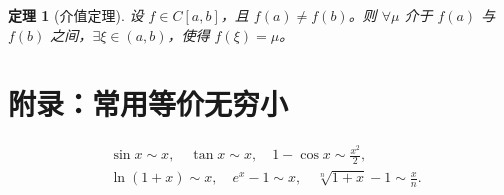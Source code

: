 \documentclass[12pt, a4paper]{article}
\newtheorem{theorem}{定理}[section]
\begin{document}
\begin{theorem}[介值定理]
设 $f \in C[a,b]$，且 $f(a) \neq f(b)$。则 $\forall \mu$ 介于 $f(a)$ 与 $f(b)$ 之间，$\exists \xi \in (a,b)$，使得 $f(\xi) = \mu$。
\end{theorem}

\section*{附录：常用等价无穷小}
\[
\begin{aligned}
&\sin x \sim x, \quad \tan x \sim x, \quad 1 - \cos x \sim \frac{x^2}{2}, \\
&\ln(1+x) \sim x, \quad e^x - 1 \sim x, \quad \sqrt[n]{1+x} - 1 \sim \frac{x}{n}.
\end{aligned}
\]
\end{document}
